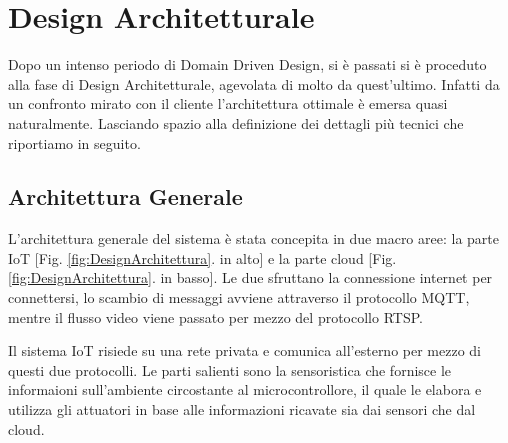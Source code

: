 

\chapter{Design Architetturale}
    Dopo un intenso periodo di Domain Driven Design, si è passati si è proceduto alla fase di Design Architetturale, agevolata di molto da quest'ultimo. Infatti da un confronto mirato con il cliente l'architettura ottimale è emersa quasi naturalmente. Lasciando spazio alla definizione dei dettagli più tecnici che riportiamo in seguito.
    \section{Architettura Generale}
    L'architettura generale del sistema è stata concepita in due macro aree: la parte IoT [Fig. \ref{fig:DesignArchitettura}. in alto] e la parte cloud [Fig. \ref{fig:DesignArchitettura}. in basso]. Le due sfruttano la connessione internet per connettersi, lo scambio di messaggi avviene attraverso il protocollo MQTT, mentre il flusso video viene passato per mezzo del protocollo RTSP. 
    
    Il sistema IoT risiede su una rete privata e comunica all'esterno per mezzo di questi due protocolli. Le parti salienti sono la sensoristica che fornisce le informaioni sull'ambiente circostante al microcontrollore, il quale le elabora e utilizza gli attuatori in base alle informazioni ricavate sia dai sensori che dal cloud.
    
